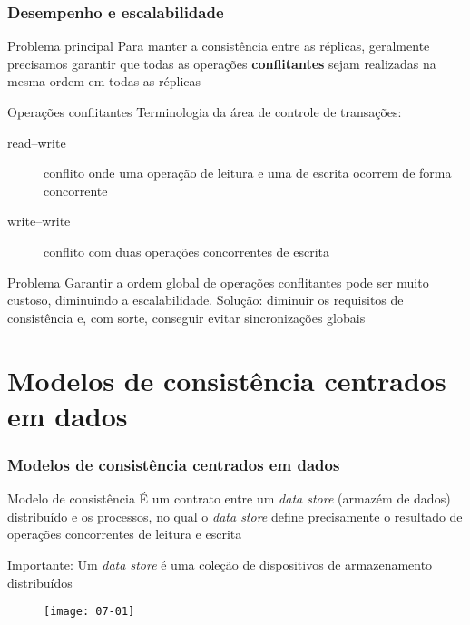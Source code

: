 \documentclass[Ligatures=TeX,table,brazil,svgnames,usetotalslideindicator,compress,10pt]{beamer}
\begin{document}
\begin{frame}
  \frametitle{Desempenho e escalabilidade}
  \begin{block}{Problema principal}
    Para manter a consistência entre as réplicas, geralmente
    precisamos garantir que todas as operações \textbf{conflitantes}
    sejam realizadas na mesma ordem em todas as réplicas
  \end{block}

  \begin{block}{Operações conflitantes}
    Terminologia da área de controle de transações:
    \begin{description}
    \item[read--write] conflito onde uma operação de leitura e uma de escrita ocorrem de forma concorrente
    \item[write--write] conflito com duas operações concorrentes de escrita
    \end{description}
  \end{block}

  \begin{block}{Problema}
    Garantir a ordem global de operações conflitantes pode ser muito
    custoso, diminuindo a escalabilidade. \alert{Solução:} diminuir os
    requisitos de consistência e, com sorte, conseguir evitar
    sincronizações globais
  \end{block}

\end{frame}

\section{Modelos de consistência centrados em dados}

\begin{frame}
  \frametitle{Modelos de consistência centrados em dados}

  \begin{block}{Modelo de consistência}
    É um contrato entre um \textit{data store} (armazém de dados) distribuído e os processos, no qual o \textit{data store} define precisamente o resultado de operações concorrentes de leitura e escrita
  \end{block}

  \begin{alertblock}{Importante:}
    Um \textit{data store} é uma coleção de dispositivos de armazenamento distribuídos
    \begin{figure}
      \centering
      \texttt{[image: 07-01]}
    \end{figure}
  \end{alertblock}

\end{frame}
\end{document}
